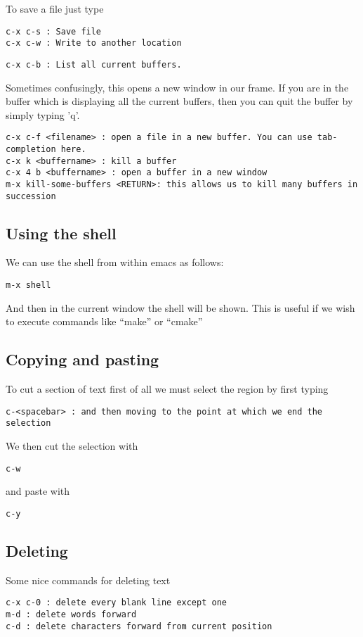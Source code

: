 \documentclass[a4paper, 10pt]{article}
\begin{document}
To save a file just type
\begin{verbatim}
c-x c-s : Save file
c-x c-w : Write to another location
\end{verbatim}


\begin{verbatim}
c-x c-b : List all current buffers. 
\end{verbatim}
Sometimes confusingly, this opens a new window in our frame. If you are in the  buffer which is displaying all the current buffers, then you can quit the buffer by simply typing 'q'.
\begin{verbatim}
c-x c-f <filename> : open a file in a new buffer. You can use tab-completion here.
c-x k <buffername> : kill a buffer
c-x 4 b <buffername> : open a buffer in a new window
m-x kill-some-buffers <RETURN>: this allows us to kill many buffers in succession
\end{verbatim}

\subsection*{Using the shell}
We can use the shell from within emacs as follows:
\begin{verbatim}
m-x shell
\end{verbatim}
And then in the current window the shell will be shown. This is useful if we wish to execute commands like ``make'' or ``cmake''
 
\subsection*{Copying and pasting}
To cut a section of text first of all we must select the region by first typing
\begin{verbatim}
c-<spacebar> : and then moving to the point at which we end the selection
\end{verbatim}
We then cut the selection with 
\begin{verbatim}
c-w
\end{verbatim}
and paste with 
\begin{verbatim}
c-y
\end{verbatim}

\subsection{Deleting}
\label{sec:deleting}

Some nice commands for deleting text
\begin{verbatim}
c-x c-0 : delete every blank line except one
m-d : delete words forward
c-d : delete characters forward from current position
\end{verbatim}
\end{document}
